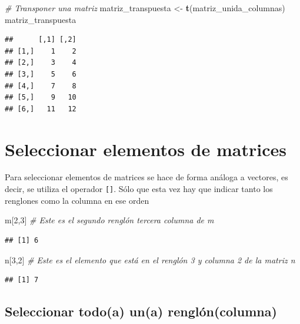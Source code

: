 \documentclass[
]{book}
\newenvironment{Shaded}{\begin{snugshade}}{\end{snugshade}}
\newcommand{\CommentTok}[1]{\textcolor[rgb]{0.56,0.35,0.01}{\textit{#1}}}
\newcommand{\DecValTok}[1]{\textcolor[rgb]{0.00,0.00,0.81}{#1}}
\newcommand{\FunctionTok}[1]{\textcolor[rgb]{0.13,0.29,0.53}{\textbf{#1}}}
\newcommand{\NormalTok}[1]{#1}
\newcommand{\OtherTok}[1]{\textcolor[rgb]{0.56,0.35,0.01}{#1}}
\begin{document}
\begin{Shaded}
\begin{Highlighting}[]
\CommentTok{\# Transponer una matriz}
\NormalTok{matriz\_transpuesta }\OtherTok{\textless{}{-}} \FunctionTok{t}\NormalTok{(matriz\_unida\_columnas)}
\NormalTok{matriz\_transpuesta}
\end{Highlighting}
\end{Shaded}

\begin{verbatim}
##      [,1] [,2]
## [1,]    1    2
## [2,]    3    4
## [3,]    5    6
## [4,]    7    8
## [5,]    9   10
## [6,]   11   12
\end{verbatim}

\section{Seleccionar elementos de matrices}\label{seleccionar-elementos-de-matrices}

Para seleccionar elementos de matrices se hace de forma análoga a vectores, es decir, se utiliza el operador \texttt{{[}{]}}. Sólo que esta vez hay que indicar tanto los renglones como la columna en ese orden

\begin{Shaded}
\begin{Highlighting}[]
\NormalTok{m[}\DecValTok{2}\NormalTok{,}\DecValTok{3}\NormalTok{]  }\CommentTok{\# Este es el segundo renglón tercera columna de m}
\end{Highlighting}
\end{Shaded}

\begin{verbatim}
## [1] 6
\end{verbatim}

\begin{Shaded}
\begin{Highlighting}[]
\NormalTok{n[}\DecValTok{3}\NormalTok{,}\DecValTok{2}\NormalTok{]  }\CommentTok{\# Este es el elemento que está en el renglón 3 y columna 2 de la matriz n }
\end{Highlighting}
\end{Shaded}

\begin{verbatim}
## [1] 7
\end{verbatim}

\subsection{Seleccionar todo(a) un(a) renglón(columna)}\label{seleccionar-todoa-una-rengluxf3ncolumna}
\end{document}
